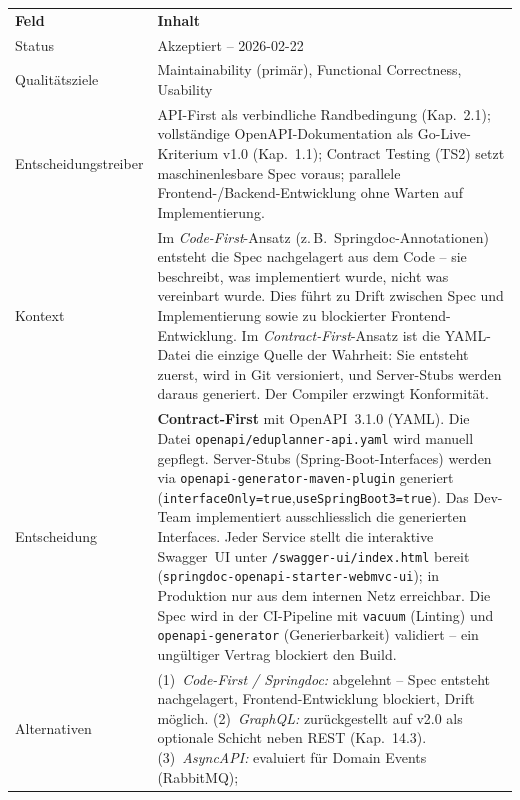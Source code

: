 \begin{tabularx}{\textwidth}{L{3.5cm} X}
  \color{white}\textbf{Feld} & \color{white}\textbf{Inhalt} \\
  Status & Akzeptiert -- 2026-02-22 \\
  Qualitätsziele & Maintainability (primär), Functional Correctness, Usability \\
  Entscheidungstreiber &
  API-First als verbindliche Randbedingung (Kap.~2.1);
  vollständige OpenAPI-Dokumentation als Go-Live-Kriterium v1.0 (Kap.~1.1);
  Contract Testing (TS2) setzt maschinenlesbare Spec voraus;
  parallele Frontend-/Backend-Entwicklung ohne Warten auf Implementierung. \\
  Kontext &
  Im \emph{Code-First}-Ansatz (z.\,B.\ Springdoc-Annotationen) entsteht
  die Spec nachgelagert aus dem Code -- sie beschreibt, was implementiert
  wurde, nicht was vereinbart wurde. Dies führt zu Drift zwischen Spec
  und Implementierung sowie zu blockierter Frontend-Entwicklung.
  Im \emph{Contract-First}-Ansatz ist die YAML-Datei die einzige
  Quelle der Wahrheit: Sie entsteht zuerst, wird in Git versioniert,
  und Server-Stubs werden daraus generiert. Der Compiler erzwingt
  Konformität. \\
  Entscheidung &
  \textbf{Contract-First} mit OpenAPI~3.1.0 (YAML).
  Die Datei \texttt{openapi/}\allowbreak \texttt{eduplanner-}\allowbreak \texttt{api.yaml} wird manuell gepflegt.
  Server-Stubs (Spring-Boot-Interfaces) werden via
  \texttt{openapi-generator-}\allowbreak\texttt{maven-plugin} generiert
  (\texttt{interfaceOnly=true},\newline\texttt{useSpringBoot3=true}).
  Das Dev-Team implementiert ausschliesslich die generierten Interfaces.
  Jeder Service stellt die interaktive Swagger~UI unter
  \texttt{/swagger-ui/}\allowbreak\texttt{index.html} bereit
  (\texttt{springdoc-openapi-}\allowbreak\texttt{starter-webmvc-ui});
  in Produktion nur aus dem internen Netz erreichbar.
  Die Spec wird in der CI-Pipeline mit \texttt{vacuum} (Linting) und
  \texttt{openapi-generator} (Generierbarkeit) validiert --
  ein ungültiger Vertrag blockiert den Build. \\
  Alternativen &
  (1)~\emph{Code-First / Springdoc:} abgelehnt -- Spec entsteht
  nachgelagert, Frontend-Entwicklung blockiert, Drift möglich.
  (2)~\emph{GraphQL:} zurückgestellt auf v2.0 als optionale Schicht
  neben REST (Kap.~14.3).
  (3)~\emph{AsyncAPI:} evaluiert für Domain Events (RabbitMQ);

\end{tabularx}
